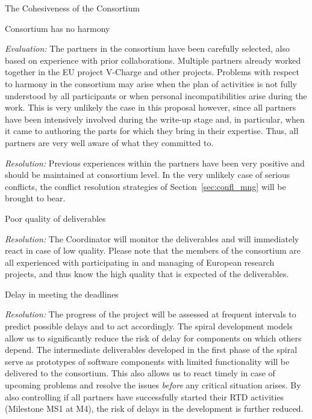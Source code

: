 
\begin{riskslabeled}{The Cohesiveness of the Consortium}
\item Consortium has no harmony

{\em Evaluation:} The partners in the consortium have been carefully
selected, also based on experience with prior collaborations. Multiple
partners already worked together in the EU project V-Charge and other projects. Problems with respect to harmony in the
consortium may arise when the plan of activities is not fully
understood by all participants or when personal incompatibilities
arise during the work. This is very unlikely the case in this proposal
however, since all partners have been intensively involved during the
write-up stage and, in particular, when it came to authoring the parts
for which they bring in their expertise. Thus, all partners are very
well aware of what they committed to.

{\em Resolution:} Previous experiences within the partners have been
very positive and should be maintained at consortium level. In the
very unlikely case of serious conflicts, the conflict resolution
strategies of Section~\ref{sec:confl_mng} will be brought to bear.


\item Poor quality of deliverables

{\em Resolution:} The Coordinator will monitor the deliverables and
will immediately react in case of low quality. Please note that the
members of the \Project{} consortium are all experienced with
participating in and managing of European research projects, and thus
know the high quality that is expected of the deliverables.



\item Delay in meeting the deadlines

{\em Resolution:} The progress of the project will be assessed at
frequent intervals to predict possible delays and to act
accordingly. The spiral development models allow us to significantly
reduce the risk of delay for components on which others depend.  The
intermediate deliverables developed in the first phase of the spiral
serve as prototypes of software components with limited functionality
will be delivered to the consortium. This also allows us to react
timely in case of upcoming problems and resolve the issues
\emph{before} any critical situation arises. By also controlling if
all partners have successfully started their RTD activities (Milestone
MS1 at M4), the risk of delays in the development is further reduced.
\end{riskslabeled}

